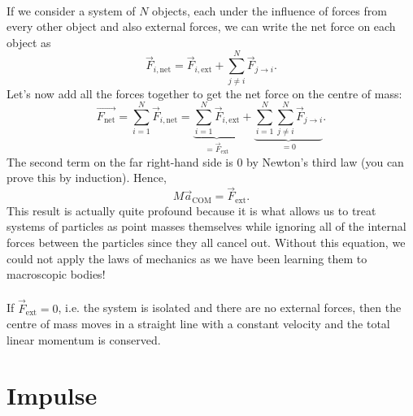 \documentclass[../newtonian_mechanics.tex]{subfiles}
\begin{document}
        \paragraph{}
        If we consider a system of $N$ objects, each under the influence of forces from every other object and also external forces, we can write the net force on each object as
        \begin{equation}
            \vec{F}_{i,\text{net}}=\vec{F}_{i,\text{ext}}+\sum_{j\neq i}^N\vec{F}_{j\to i}.
        \end{equation}
        Let's now add all the forces together to get the net force on the centre of mass:
        \begin{equation}
            \vec{F_\text{net}} = \sum_{i=1}^N\vec{F}_{i,\text{net}} = \underbrace{\sum_{i=1}^N\vec{F}_{i,\text{ext}}}_{=\vec{F}_\text{ext}}+\underbrace{\sum_{i=1}^N\sum_{j\neq i}^N\vec{F}_{j\to i}}_{=0}.
        \end{equation}
        The second term on the far right-hand side is 0 by Newton's third law (you can prove this by induction).
        Hence,
        \begin{equation}\label{eq-NII-macroscopic}
            M\vec{a}_\text{COM}=\vec{F}_\text{ext}.
        \end{equation}
        This result is actually quite profound because it is what allows us to treat systems of particles as point masses themselves while ignoring all of the internal forces between the particles since they all cancel out.
        Without this equation, we could not apply the laws of mechanics as we have been learning them to macroscopic bodies!
        
        \paragraph{}
        If $\vec{F}_\text{ext}=0$, i.e. the system is isolated and there are no external forces, then the centre of mass moves in a straight line with a constant velocity and the total linear momentum is conserved.

    \section{Impulse}
\end{document}
